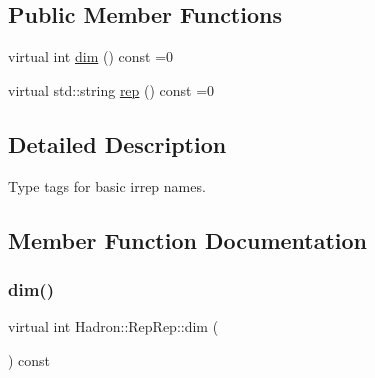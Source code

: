 \subsection*{Public Member Functions}
\begin{DoxyCompactItemize}
\item 
virtual int \mbox{\hyperlink{structHadron_1_1RepRep_a92c8802e5ed7afd7da43ccfd5b7cd92b}{dim}} () const =0
\item 
virtual std\+::string \mbox{\hyperlink{structHadron_1_1RepRep_ab3213025f6de249f7095892109575fde}{rep}} () const =0
\end{DoxyCompactItemize}


\subsection{Detailed Description}
Type tags for basic irrep names. 

\subsection{Member Function Documentation}
\mbox{\label{structHadron_1_1RepRep_a92c8802e5ed7afd7da43ccfd5b7cd92b}} 
\subsubsection{\texorpdfstring{dim()}{dim()}}
{\footnotesize\ttfamily virtual int Hadron\+::\+Rep\+Rep\+::dim (\begin{DoxyParamCaption}{ }\end{DoxyParamCaption}) const\hspace{0.3cm}{\ttfamily [pure virtual]}}



